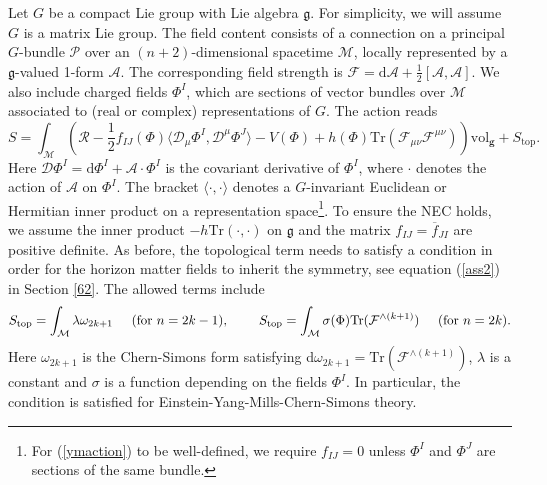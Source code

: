 \documentclass[11pt, reqno]{amsart}
\theoremstyle{plain}
\theoremstyle{definition}
\numberwithin{equation}{section}
\def\be{\begin{equation}}
\def\ee{\end{equation}}
\begin{document}
Let $G$ be a compact Lie group with Lie algebra $\mathfrak{g}$. For simplicity, we will assume $G$ is a matrix Lie group. The field content consists of a connection on a principal $G$-bundle $\mathcal{P}$ over an $(n+2)$-dimensional spacetime $\mathcal{M}$, locally represented by a $\mathfrak{g}$-valued 1-form $\mathcal{A}$. The corresponding field strength is $\mathcal{F} = \text{d}\mathcal{A} + \frac 12[\mathcal{A},\mathcal{A}]$. We also include charged fields $\Phi^I$, which are sections of vector bundles over $\mathcal{M}$ associated to (real or complex) representations of $G$. The action reads
\be \label{ymaction} 
    S = \int_{\mathcal{M}} \left(\mathcal{R} - \frac 12 f_{IJ}(\Phi)\langle \mathcal{D}_\mu \Phi^I, \mathcal{D}^\mu \Phi^J\rangle - V(\Phi) + h(\Phi)\text{Tr}(\mathcal{F}_{\mu\nu}\mathcal{F}^{\mu\nu})\right)\text{vol}_{\textbf{g}} + S_{\text{top}}. 
\ee
Here $\mathcal{D}\Phi^I = \text{d}\Phi^I + \mathcal{A}\cdot \Phi^I$ is the covariant derivative of $\Phi^I$, where $\cdot$ denotes the action of $\mathcal{A}$ on $\Phi^I$. The bracket $\langle \cdot , \cdot \rangle$ denotes a $G$-invariant Euclidean or Hermitian inner product on a representation space\footnote{For (\ref{ymaction}) to be well-defined, we require $f_{IJ} = 0$ unless $\Phi^I$ and $\Phi^J$ are sections of the same bundle.}. To ensure the NEC holds, we assume the inner product $-h\text{Tr}(\cdot,\cdot)$ on $\mathfrak{g}$ and the matrix $f_{IJ} = \overline{f}_{JI}$ are positive definite. As before, the topological term needs to satisfy a condition in order for the horizon matter fields to inherit the symmetry, see equation (\ref{ass2}) in Section \ref{62}. The allowed terms include
\begin{equation} \label{stop}
    S_{\text{top}} = \int_{\mathcal{M}}
    \lambda \omega_{2k+1} \hspace{.5cm}(\text{for } n = 2k-1), \hspace{.8cm} S_{\text{top}} = \int_{\mathcal{M}} \sigma(\Phi)\text{Tr}(\mathcal{F}^{\wedge (k+1)}) \hspace{.5cm}(\text{for } n = 2k).
\end{equation}
Here $\omega_{2k+1}$ is the Chern-Simons form satisfying d$\omega_{2k+1} = \text{Tr}(\mathcal{F}^{\wedge (k+1)})$, $\lambda$ is a constant and $\sigma$ is a function depending on the fields $\Phi^I$. In particular, the condition is satisfied for Einstein-Yang-Mills-Chern-Simons theory.
\end{document}
